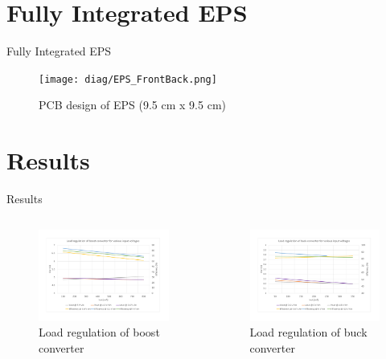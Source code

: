 \documentclass[aspectratio=169]{beamer}
\begin{document}
		\section{Fully Integrated EPS}	
		\begin{frame}{Fully Integrated EPS}
			\begin{figure}[h]
				\centering
				\texttt{[image: diag/EPS\_FrontBack.png]}
				\caption{PCB design of EPS (9.5 cm x 9.5 cm)}
				\label{fig:meshn}
			\end{figure}
		\end{frame}
		
		
		\section{Results}
		\begin{frame}{Results}
			\begin{columns}[c] %
				\begin{column}{0.5\textwidth} %
					\begin{figure}
						\includegraphics[width=8cm]{Load regulation of boost.pdf}
						\caption{Load regulation of boost converter}
					\end{figure}
				\end{column}
				\begin{column}{0.5\textwidth} %
					\begin{figure}
						\includegraphics[width=8cm]{Load regulation of buck.pdf}
						\caption{Load regulation of buck converter}
					\end{figure}
					
				\end{column}
			\end{columns}	
		\end{frame}
		
\end{document}
